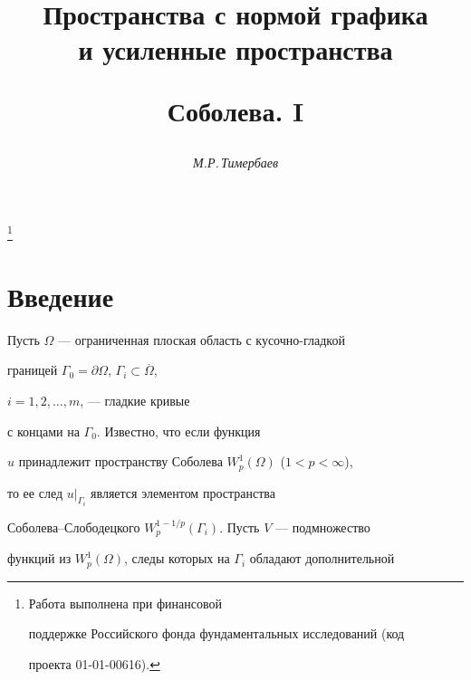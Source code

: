 \author{\it М.Р.\,Тимербаев}




\title{Пространства с нормой графика \\ и усиленные пространства


Соболева. I}


\thanks{Работа выполнена при финансовой


поддержке Российского фонда фундаментальных исследований (код


проекта 01-01-00616).}





\date{}




\pagestyle{plain} %







\maketitle


\label{begin}








\section*{Введение}





Пусть $\Omega$ --- ограниченная плоская область с кусочно-гладкой


границей $\Gamma_0=\partial \Omega$, $\Gamma_i \subset \overline{\Omega}$,


$i=1,2,\dotsc,m$, --- гладкие кривые 


с концами на $\Gamma_0$. Известно, что если функция


$u$ принадлежит пространству Соболева $W_p^1(\Omega)$ ($1<p<\infty$),


то ее след $u|_{\Gamma_i}$ является элементом пространства


Соболева--Слободецкого $W_p^{1-1/p}(\Gamma_i)$. Пусть $V$ --- подмножество


функций из $W_p^1(\Omega)$, следы которых на $\Gamma_i$ обладают дополнительной


